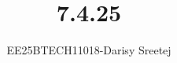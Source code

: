 \documentclass[journal]{IEEEtran}
\begin{document}

\vspace{3cm}
\title{7.4.25}
\author{EE25BTECH11018-Darisy Sreetej}
 \maketitle
{\let\newpage\relax\maketitle}

\renewcommand{\thefigure}{\theenumi}
\renewcommand{\thetable}{\theenumi}
\setlength{\intextsep}{10pt} %


\renewcommand{\thetable}{\theenumi}
\end{document}
